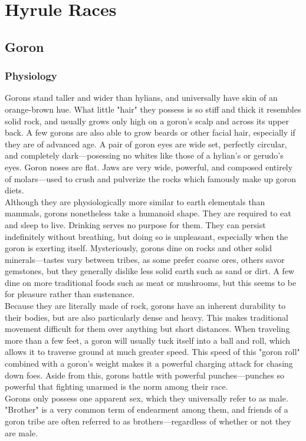 \documentclass[10pt,twoside,twocolumn,openany]{book}
\begin{document}
\selectfont %


\chapter{Hyrule Races}

\section{Goron}

\subsection{Physiology}
Gorons stand taller and wider than hylians, and universally have skin of an orange-brown hue. What little "hair" they possess is so stiff and thick it resembles solid rock, and usually grows only high on a goron's scalp and across its upper back. A few gorons are also able to grow beards or other facial hair, especially if they are of advanced age. A pair of goron eyes are wide set, perfectly circular, and completely dark—posessing no whites like those of a hylian's or gerudo's eyes. Goron noses are flat. Jaws are very wide, powerful, and composed entirely of molars—used to crush and pulverize the rocks which famously make up goron diets.\\
Although they are physiologically more similar to earth elementals than mammals, gorons nonetheless take a humanoid shape. They are required to eat and sleep to live. Drinking serves no purpose for them. They can persist indefinitely without breathing, but doing so is unpleasant, especially when the goron is exerting itself. Mysteriously, gorons dine on rocks and other solid minerals—tastes vary between tribes, as some prefer coarse ores, others savor gemstones, but they generally dislike less solid earth such as sand or dirt. A few dine on more traditional foods such as meat or mushrooms, but this seems to be for pleasure rather than sustenance.\\
Because they are literally made of rock, gorons have an inherent durability to their bodies, but are also particularly dense and heavy. This makes traditional movement difficult for them over anything but short distances. When traveling more than a few feet, a goron will usually tuck itself into a ball and roll, which allows it to traverse ground at much greater speed. This speed of this "goron roll" combined with a goron's weight makes it a powerful charging attack for chasing down foes. Aside from this, gorons battle with powerful punches—punches so powerful that fighting unarmed is the norm among their race.\\
Gorons only possess one apparent sex, which they universally refer to as male. "Brother" is a very common term of endearment among them, and friends of a goron tribe are often referred to as brothers—regardless of whether or not they are male.
\end{document}
